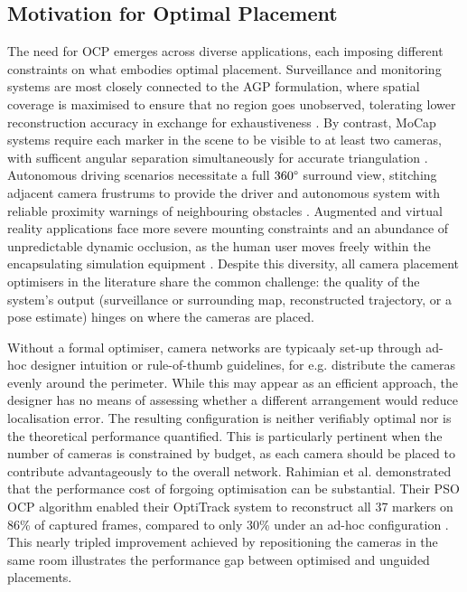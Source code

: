 \subsection{Motivation for Optimal Placement}
The need for \gls{OCP} emerges across diverse applications, each imposing different constraints on what embodies optimal placement. Surveillance and monitoring systems are most closely connected to the \gls{AGP} formulation, where spatial coverage is maximised to ensure that no region goes unobserved, tolerating lower reconstruction accuracy in exchange for exhaustiveness \parencite{bodorOptimalCameraPlacement2007}. By contrast, \gls{MoCap} systems require each marker in the scene to be visible to at least two cameras, with sufficent angular separation simultaneously for accurate triangulation  \parencite{aissaouiDesigningCameraPlacement2018, zieglerOptimalCameraPlacement2023, zhouSensorPlacementOptimization2024}. Autonomous driving scenarios necessitate a full $360 \degree$ surround view, stitching adjacent camera frustrums to provide the driver  and autonomous system with reliable proximity warnings of neighbouring obstacles \parencite{puligandlaMultiresolutionApproachLarge2022}. Augmented and virtual reality applications face more severe mounting constraints and an abundance of unpredictable dynamic occlusion, as the human user moves freely within the encapsulating simulation equipment \parencite{rahimianOptimalCameraPlacement2017}. Despite this diversity, all camera placement optimisers in the literature share the common challenge: the quality of the system's output (surveillance or surrounding map, reconstructed trajectory, or a pose estimate) hinges on where the cameras are placed.

Without a formal optimiser, camera networks are typicaaly set-up through ad-hoc designer intuition or rule-of-thumb  guidelines, for e.g. distribute the cameras evenly around the perimeter. While this may appear as an efficient approach, the designer has no means of assessing whether a different arrangement would reduce localisation error. The resulting configuration is neither verifiably optimal nor is the theoretical performance quantified. This is particularly pertinent when the number of cameras is constrained by budget, as each camera should be placed to contribute advantageously to the overall network. Rahimian et al. demonstrated that the performance cost of forgoing optimisation can be substantial. Their \gls{PSO} \gls{OCP} algorithm enabled their OptiTrack system to reconstruct all 37 markers on 86\% of captured frames, compared to only 30\% under an ad-hoc configuration \parencite{rahimianOptimalCameraPlacement2017}. This nearly tripled improvement achieved by repositioning the cameras in the same room illustrates the performance gap between optimised and unguided placements. 

